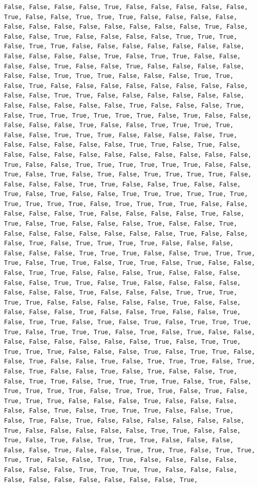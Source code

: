 \documentclass[
  letterpaper,
  DIV=11,
  numbers=noendperiod]{scrartcl}
\begin{document}
\begin{verbatim}
False, False, False, False, True, False, False, False, False, False, True, False, False, True, True, True, False, False, False, False, False, False, False, False, False, False, False, False, True, False, False, False, True, False, False, False, False, True, True, True, False, True, True, False, False, False, False, False, False, False, False, False, False, False, True, False, True, True, False, False, False, False, True, False, False, True, False, False, False, False, False, False, True, True, True, False, False, False, True, True, False, True, False, False, False, False, False, False, False, False, False, False, True, True, False, False, False, False, False, False, False, False, False, False, False, True, False, False, False, True, False, True, True, True, True, True, True, False, True, False, False, False, False, False, True, False, False, True, True, True, True, False, False, True, True, True, False, False, False, False, True, False, False, False, False, False, True, True, False, True, False, False, False, False, False, False, False, False, False, False, False, True, False, False, True, True, True, True, True, True, False, False, True, False, True, False, True, False, True, True, True, True, False, False, False, False, True, True, False, False, True, False, False, True, False, True, False, False, True, True, True, True, True, True, True, True, True, True, False, True, True, True, True, False, False, False, False, False, True, False, False, False, False, True, False, True, False, True, False, False, False, True, False, False, True, False, False, False, False, False, False, False, True, False, False, False, True, False, True, True, True, True, False, False, False, False, False, False, True, True, True, False, False, True, True, True, True, False, True, True, False, True, True, False, True, False, False, False, True, True, False, False, False, True, False, False, False, False, False, True, True, False, True, False, False, False, False, False, False, False, True, False, False, False, True, True, True, True, True, False, False, False, False, False, True, False, False, False, False, False, True, False, False, True, False, False, True, False, True, True, False, True, False, True, False, True, True, True, True, False, True, True, True, False, True, False, True, False, False, False, False, False, False, False, False, True, False, True, True, True, True, True, False, False, False, True, False, True, True, False, False, True, False, False, True, False, True, True, True, False, True, False, True, False, False, True, False, True, False, False, True, False, True, True, False, True, True, True, True, False, True, False, True, True, True, True, False, True, True, True, False, True, False, True, True, True, False, False, False, True, False, False, False, False, False, True, False, True, True, True, False, False, True, False, True, False, True, False, False, False, False, False, False, True, False, False, False, False, False, True, True, False, False, True, False, True, False, True, True, True, False, False, False, False, False, True, False, False, True, True, True, False, True, True, True, True, False, False, True, True, False, False, False, False, False, False, False, True, True, True, True, False, False, False, False, False, False, False, False, False, False, True, 
\end{verbatim}
\end{document}
